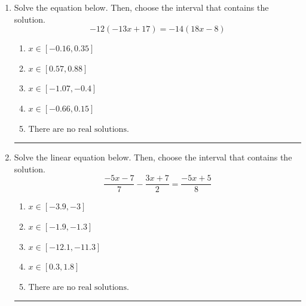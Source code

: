 \documentclass[14pt]{extbook}
\newcommand{\litem}[1]{\item#1\hspace*{-1cm}\rule{\textwidth}{0.4pt}}
\begin{document}
\begin{enumerate}
{\begin{enumerate}[label=\Alph*.]
\end{enumerate} }
\litem{
Solve the equation below. Then, choose the interval that contains the solution.\[ -12(-13x + 17) = -14(18x -8) \]\begin{enumerate}[label=\Alph*.]
\item \( x \in [-0.16, 0.35] \)
\item \( x \in [0.57, 0.88] \)
\item \( x \in [-1.07, -0.4] \)
\item \( x \in [-0.66, 0.15] \)
\item \( \text{There are no real solutions.} \)

\end{enumerate} }
\litem{
Solve the linear equation below. Then, choose the interval that contains the solution.\[ \frac{-5x -7}{7} - \frac{3x + 7}{2} = \frac{-5x + 5}{8} \]\begin{enumerate}[label=\Alph*.]
\item \( x \in [-3.9, -3] \)
\item \( x \in [-1.9, -1.3] \)
\item \( x \in [-12.1, -11.3] \)
\item \( x \in [0.3, 1.8] \)
\item \( \text{There are no real solutions.} \)


\end{enumerate}}
\end{enumerate}
\end{document}
